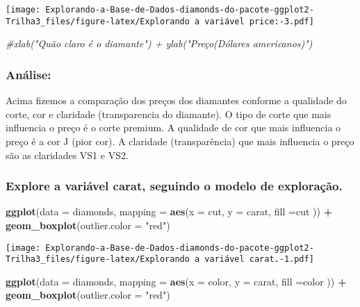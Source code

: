 \documentclass[
]{article}
\newenvironment{Shaded}{\begin{snugshade}}{\end{snugshade}}
\newcommand{\CommentTok}[1]{\textcolor[rgb]{0.56,0.35,0.01}{\textit{#1}}}
\newcommand{\DataTypeTok}[1]{\textcolor[rgb]{0.13,0.29,0.53}{#1}}
\newcommand{\KeywordTok}[1]{\textcolor[rgb]{0.13,0.29,0.53}{\textbf{#1}}}
\newcommand{\NormalTok}[1]{#1}
\newcommand{\OperatorTok}[1]{\textcolor[rgb]{0.81,0.36,0.00}{\textbf{#1}}}
\newcommand{\StringTok}[1]{\textcolor[rgb]{0.31,0.60,0.02}{#1}}
\begin{document}
\texttt{[image: Explorando-a-Base-de-Dados-diamonds-do-pacote-ggplot2-Trilha3\_files/figure-latex/Explorando a variável price:-3.pdf]}

\begin{Shaded}
\begin{Highlighting}[]
\CommentTok{#xlab("Quão claro é o diamante") + ylab("Preço(Dólares americanos)")}
\end{Highlighting}
\end{Shaded}

\hypertarget{anuxe1lise}{%
\subsubsection{Análise:}\label{anuxe1lise}}

Acima fizemos a comparação dos preços dos diamantes conforme a qualidade
do corte, cor e claridade (transparencia do diamante). O tipo de corte
que mais influencia o preço é o corte premium. A qualidade de cor que
mais influencia o preço é a cor J (pior cor). A claridade
(transparência) que mais influencia o preço são as claridades VS1 e VS2.

\hypertarget{explore-a-variuxe1vel-carat-seguindo-o-modelo-de-explorauxe7uxe3o.}{%
\subsubsection{Explore a variável carat, seguindo o modelo de
exploração.}\label{explore-a-variuxe1vel-carat-seguindo-o-modelo-de-explorauxe7uxe3o.}}

\begin{Shaded}
\begin{Highlighting}[]
\KeywordTok{ggplot}\NormalTok{(}\DataTypeTok{data =}\NormalTok{ diamonds, }\DataTypeTok{mapping =} \KeywordTok{aes}\NormalTok{(}\DataTypeTok{x =}\NormalTok{ cut, }\DataTypeTok{y =}\NormalTok{ carat, }\DataTypeTok{fill =}\NormalTok{cut )) }\OperatorTok{+}\StringTok{ }\KeywordTok{geom_boxplot}\NormalTok{(}\DataTypeTok{outlier.color =} \StringTok{"red"}\NormalTok{)}
\end{Highlighting}
\end{Shaded}

\texttt{[image: Explorando-a-Base-de-Dados-diamonds-do-pacote-ggplot2-Trilha3\_files/figure-latex/Explorando a variável carat.-1.pdf]}

\begin{Shaded}
\begin{Highlighting}[]
\KeywordTok{ggplot}\NormalTok{(}\DataTypeTok{data =}\NormalTok{ diamonds, }\DataTypeTok{mapping =} \KeywordTok{aes}\NormalTok{(}\DataTypeTok{x =}\NormalTok{ color, }\DataTypeTok{y =}\NormalTok{ carat, }\DataTypeTok{fill =}\NormalTok{color )) }\OperatorTok{+}\StringTok{ }\KeywordTok{geom_boxplot}\NormalTok{(}\DataTypeTok{outlier.color =} \StringTok{"red"}\NormalTok{)}
\end{Highlighting}
\end{Shaded}
\end{document}
